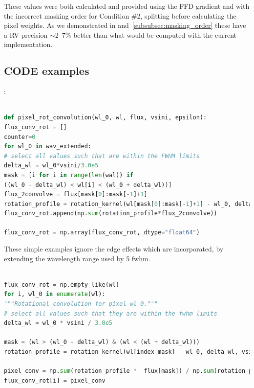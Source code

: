 These values were both calculated and provided using the FFD gradient and with the incorrect masking order for Condition \#2, splitting before calculating the pixel weights. As we demonstrated in  and~\ref{subsubsec:masking_order} these have a RV precision \(\sim\)2--7\% better than what would be computed with the current implementation.



\subsection{CODE examples}:

\begin{lstlisting}[language=Python, caption=Python example old]

def pixel_rot_convolution(wl_0, wl, flux, vsini, epsilon):
flux_conv_rot = []
counter=0
for wl_0 in wav_extended:
# select all values such that are within the FWHM limits
delta_wl = wl_0*vsini/3.0e5
mask = [i for i in range(len(wal)) if
((wl_0 - delta_wl) < wl[i] < (wl_0 + delta_wl))]
flux_2convolve = flux[mask[0]:mask[-1]+1]
rotation_profile = rotation_kernel(wl[mask[0]:mask[-1]+1] - wl_0, delta_wl, vsini, epsilon)
flux_conv_rot.append(np.sum(rotation_profile*flux_2convolve))

flux_conv_rot = np.array(flux_conv_rot, dtype="float64")

\end{lstlisting}

These simple examples ignore the edge effects which are incorporated, by extending the wavelength range used by 5 fwhm.
\begin{lstlisting}[language=Python, caption=Python example]

flux_conv_rot = np.empty_like(wl)
for i, wl_0 in enumerate(wl):
"""Rotational convolution for pixel wl_0."""
# select all values such that they are within the fwhm limits
delta_wl = wl_0 * vsini / 3.0e5

mask = (wl > (wl_0 - delta_wl) & (wl < (wl + delta_wl)))
rotation_profile = rotation_kernel(wl[index_mask] - wl_0, delta_wl, vsini, epsilon)

pixel_conv = np.sum(rotation_profile *  flux[mask]) / np.sum(rotation_profile)
flux_conv_rot[i] = pixel_conv

\end{lstlisting}


